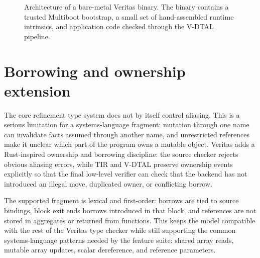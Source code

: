 \begin{figure}[H]
  \captionsetup{
    aboveskip=4pt,
    belowskip=-8pt
  }
  \caption{Architecture of a bare-metal Veritas binary. The binary contains a trusted Multiboot bootstrap, a small set of hand-assembled runtime intrinsics, and application code checked through the V-DTAL pipeline.}
  \label{fig:unikernel-arch}
\end{figure}

\section{Borrowing and ownership extension}\label{sec:ownership-extension}

The core refinement type system does not by itself control aliasing. This is a serious limitation for a systems-language fragment: mutation through one name can invalidate facts assumed through another name, and unrestricted references make it unclear which part of the program owns a mutable object. Veritas adds a Rust-inspired ownership and borrowing discipline: the source checker rejects obvious aliasing errors, while TIR and V-DTAL preserve ownership events explicitly so that the final low-level verifier can check that the backend has not introduced an illegal move, duplicated owner, or conflicting borrow.


The supported fragment is lexical and first-order: borrows are tied to source bindings, block exit ends borrows introduced in that block, and references are not stored in aggregates or returned from functions. This keeps the model compatible with the rest of the Veritas type checker while still supporting the common systems-language patterns needed by the feature suite: shared array reads, mutable array updates, scalar dereference, and reference parameters.

